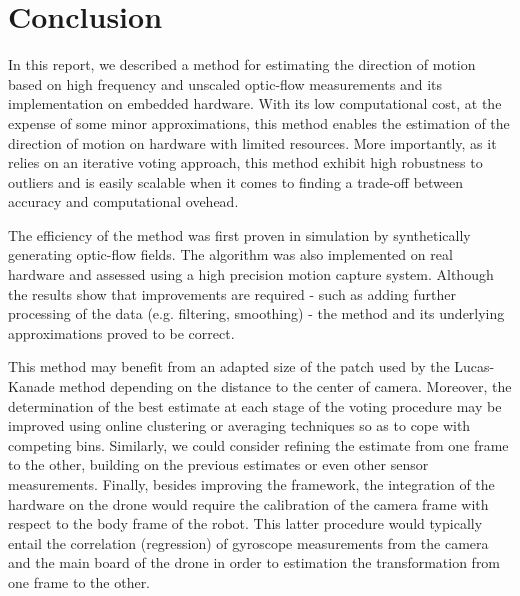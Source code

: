 \section{Conclusion}
In this report, we described a method for estimating the direction of motion based on high frequency and unscaled optic-flow measurements and its implementation on embedded hardware. With its low computational cost, at the expense of some minor approximations, this method enables the estimation of the direction of motion on hardware with limited resources. More importantly, as it relies on an iterative voting approach, this method exhibit high robustness to outliers and is easily scalable when it comes to finding a trade-off between accuracy and computational ovehead.

The efficiency of the method was first proven in simulation by synthetically generating optic-flow fields. The algorithm was also implemented on real hardware and assessed using a high precision motion capture system. Although the results show that improvements are required - such as adding further processing of the data (e.g. filtering, smoothing) - the method and its underlying approximations proved to be correct.

This method may benefit from an adapted size of the patch used by the Lucas-Kanade method depending on the distance to the center of camera. Moreover, the determination of the best estimate at each stage of the voting procedure may be improved using online clustering or averaging techniques so as to cope with competing bins. Similarly, we could consider refining the estimate from one frame to the other, building on the previous estimates or even other sensor measurements. Finally, besides improving the framework, the integration of the hardware on the drone would require the calibration of the camera frame with respect to the body frame of the robot. This latter procedure would typically entail the correlation (regression) of gyroscope measurements from the camera and the main board of the drone in order to estimation the transformation from one frame to the other. 